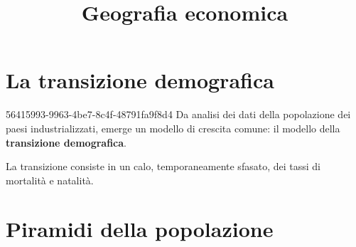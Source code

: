 \documentclass[preview]{standalone}
\begin{document}
\title{Geografia economica}
\genpage

\section{La transizione demografica}

\begin{snippet}{56415993-9963-4be7-8c4f-48791fa9f8d4}
    Da analisi dei dati della popolazione dei paesi industrializzati,
    emerge un modello di crescita comune:
    il modello della \textbf{transizione demografica}.
    
    La transizione consiste in un calo, temporaneamente sfasato,
    dei tassi di mortalità e natalità.
\end{snippet}


\section{Piramidi della popolazione}
\end{document}
